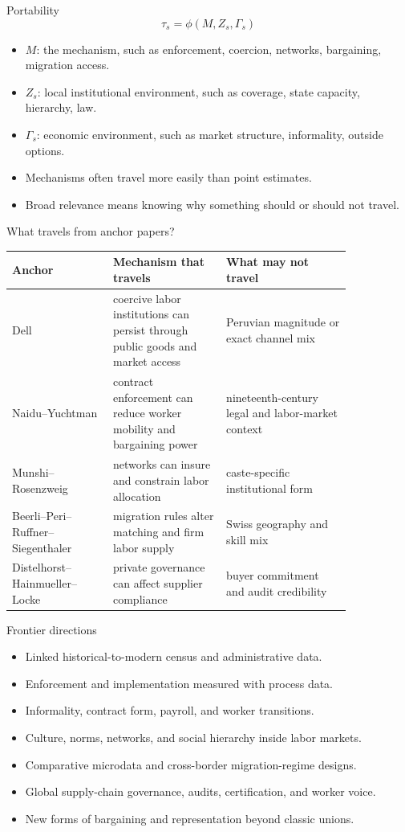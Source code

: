 \documentclass[aspectratio=169,11pt]{beamer}
\begin{document}
\begin{frame}{Portability}
\[
\tau_s = \phi(M, Z_s, \Gamma_s)
\]
\begin{itemize}
    \item $M$: the mechanism, such as enforcement, coercion, networks, bargaining, migration access.
    \item $Z_s$: local institutional environment, such as coverage, state capacity, hierarchy, law.
    \item $\Gamma_s$: economic environment, such as market structure, informality, outside options.
    \item Mechanisms often travel more easily than point estimates.
    \item Broad relevance means knowing why something should or should not travel.
\end{itemize}
\end{frame}

\begin{frame}{What travels from anchor papers?}
\small
\begin{tabular}{p{0.25\linewidth} p{0.28\linewidth} p{0.31\linewidth}}
\toprule
Anchor & Mechanism that travels & What may not travel \\
\midrule
Dell & coercive labor institutions can persist through public goods and market access & Peruvian magnitude or exact channel mix \\
Naidu--Yuchtman & contract enforcement can reduce worker mobility and bargaining power & nineteenth-century legal and labor-market context \\
Munshi--Rosenzweig & networks can insure and constrain labor allocation & caste-specific institutional form \\
Beerli--Peri--Ruffner--Siegenthaler & migration rules alter matching and firm labor supply & Swiss geography and skill mix \\
Distelhorst--Hainmueller--Locke & private governance can affect supplier compliance & buyer commitment and audit credibility \\
\bottomrule
\end{tabular}
\end{frame}

\begin{frame}{Frontier directions}
\begin{itemize}
    \item Linked historical-to-modern census and administrative data.
    \item Enforcement and implementation measured with process data.
    \item Informality, contract form, payroll, and worker transitions.
    \item Culture, norms, networks, and social hierarchy inside labor markets.
    \item Comparative microdata and cross-border migration-regime designs.
    \item Global supply-chain governance, audits, certification, and worker voice.
    \item New forms of bargaining and representation beyond classic unions.
\end{itemize}
\end{frame}
\end{document}
